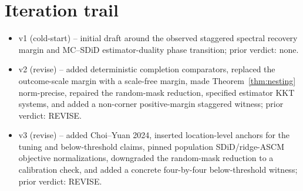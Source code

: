 \documentclass[11pt]{article}
\theoremstyle{definition}
\theoremstyle{plain}
\theoremstyle{remark}
\begin{document}
\section{Iteration trail}
\begin{itemize}[leftmargin=*]
\item v1 (cold-start) -- initial draft around the observed staggered spectral
recovery margin and MC--SDiD estimator-duality phase transition; prior
verdict: none.
\item v2 (revise) -- added deterministic completion comparators, replaced the
outcome-scale margin with a scale-free margin, made Theorem~\ref{thm:nesting}
norm-precise, repaired the random-mask reduction, specified estimator KKT
systems, and added a non-corner positive-margin staggered witness; prior
verdict: REVISE.
\item v3 (revise) -- added Choi--Yuan 2024, inserted location-level anchors
for the tuning and below-threshold claims, pinned population SDiD/ridge-ASCM
objective normalizations, downgraded the random-mask reduction to a
calibration check, and added a concrete four-by-four below-threshold witness;
prior verdict: REVISE.
\end{itemize}
\end{document}
